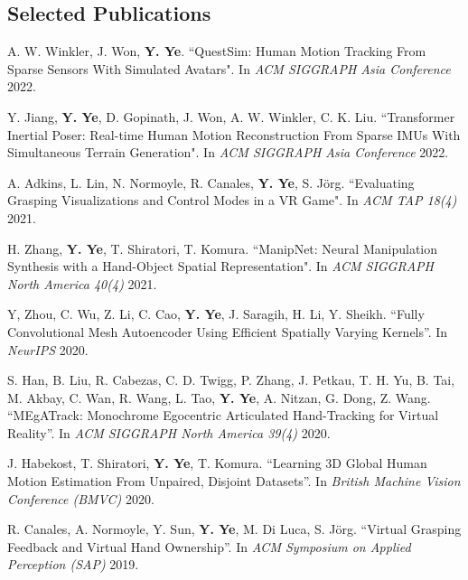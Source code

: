 \documentclass[margin,line]{res}
\begin{document}
\begin{resume}
\section{\sc Selected Publications}

A. W. Winkler, J. Won, {\bf Y. Ye}. ``QuestSim: Human Motion Tracking From Sparse Sensors With Simulated Avatars". In {\em ACM SIGGRAPH Asia Conference} 2022.

\vspace*{-.1in}
Y. Jiang, {\bf Y. Ye}, D. Gopinath, J. Won, A. W. Winkler, C. K. Liu. ``Transformer Inertial Poser: Real-time Human Motion Reconstruction From Sparse IMUs With Simultaneous Terrain Generation". In {\em ACM SIGGRAPH Asia Conference} 2022.

\vspace*{-.1in}
A. Adkins, L. Lin, N. Normoyle, R. Canales, {\bf Y. Ye}, S. J\"{o}rg. ``Evaluating Grasping Visualizations and Control Modes in a VR Game". In {\em ACM TAP 18(4)} 2021.

\vspace*{-.1in}
H. Zhang, {\bf Y. Ye}, T. Shiratori, T. Komura. ``ManipNet: Neural Manipulation Synthesis with a Hand-Object Spatial Representation". In {\em ACM SIGGRAPH North America 40(4)} 2021.

\vspace*{-.1in}
Y, Zhou, C. Wu, Z. Li, C. Cao, {\bf Y. Ye}, J. Saragih, H. Li, Y. Sheikh. ``Fully Convolutional Mesh Autoencoder Using Efficient Spatially Varying Kernels''. In {\em NeurIPS} 2020.

\vspace*{-.1in}
S. Han, B. Liu, R. Cabezas, C. D. Twigg, P. Zhang, J. Petkau, T. H. Yu, B. Tai, M. Akbay, C. Wan, R. Wang, L. Tao, {\bf Y. Ye}, A. Nitzan, G. Dong, Z. Wang. ``MEgATrack: Monochrome Egocentric Articulated Hand-Tracking for Virtual Reality''. In {\em ACM SIGGRAPH North America 39(4)} 2020.


\vspace*{-.1in}
J. Habekost, T. Shiratori, {\bf Y. Ye}, T. Komura. ``Learning 3D Global Human Motion Estimation From Unpaired, Disjoint Datasets''. In {\em British Machine Vision Conference (BMVC)} 2020.

\vspace*{-.1in}
R. Canales, A. Normoyle, Y. Sun, {\bf Y. Ye}, M. Di Luca, S. J\"{o}rg. ``Virtual Grasping Feedback and Virtual Hand Ownership''. In {\em ACM Symposium on Applied Perception (SAP)} 2019.


\end{resume}
\end{document}
